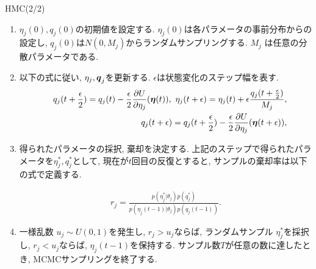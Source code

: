 \documentclass[dvipdfmx]{beamer} %
\newcommand{\backupend}{
\addtocounter{framenumberappendix}{-\value{framenumber}}
\addtocounter{framenumber}{\value{framenumberappendix}}
}
\newcommand{\bm}[1]{\mbox{\boldmath $#1$}}
\begin{document}
\begin{frame}{HMC(2/2)}

\begin{enumerate}

\item{}
$\eta_j(0), q_j(0)$の初期値を設定する. $\eta_j(0)$は各パラメータの事前分布からの設定し, $q_j(0)$は$N(0,M_j)$からランダムサンプリングする. $M_j$ は任意の分散パラメータである. 
 
\item{}

以下の式に従い, $\eta_j, \bm q_j$を更新する. $\epsilon$は状態変化のステップ幅を表す.
\footnotesize
\begin{eqnarray*}
&&q_j(t+\frac{\epsilon}{2}) = q_j(t) - \frac{\epsilon}{2} \frac{\partial U}{\partial \eta_j} (\bm \eta(t)),\ 
\eta_j(t+\epsilon) = \eta_j(t) + \epsilon \frac{q_j(t + \frac{\epsilon}{2})}{M_j},\\ 
&&q_j(t+\epsilon) = q_j(t+\frac{\epsilon}{2}) - \frac{\epsilon}{2} \frac{\partial U}{\partial \eta_j} (\bm \eta(t + \epsilon)),
\end{eqnarray*}
\normalsize

\item{}
得られたパラメータの採択, 棄却を決定する. 上記のステップで得られたパラメータを$\eta^*_j, q^*_j$として,
現在が$t$回目の反復とすると, サンプルの棄却率は以下の式で定義する.

\vspace{-0.5cm}
\begin{eqnarray*}
r_j = \frac{p(\eta^*_j|\theta_j) p(q^*_j)}{p(\eta_j(t-1)|\theta_j) p(q_j(t-1))}.
\end{eqnarray*}

\item{}
一様乱数 $u_j \sim U(0,1)$を発生し, $r_j > u_j$ならば, ランダムサンプル $\eta^*_j$を採択し, $r_j < u_j$ならば, $\eta_j(t-1)$を保持する. サンプル数$T$が任意の数に達したとき, MCMCサンプリングを終了する. 

\end{enumerate}

\end{frame}

\backupend
\end{document}
